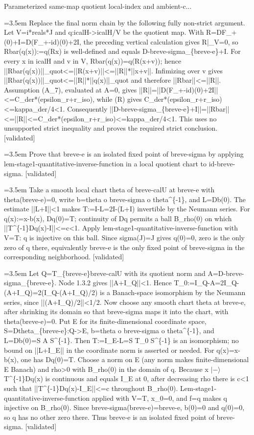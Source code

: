 \documentclass{article}
\newcommand{\step}[1]{\par\noindent\hangindent=3.5em\hangafter=1%
  \makebox[3.5em][l]{\textbf{#1.}}}
\newcommand{\steptag}[1]{\hfill{\small\textsf{[#1]}}}
\begin{document}
\begin{proofbox}{Parameterized same-map quotient local-index and ambient-c...}
\step{1.3.2.2} Replace the final norm chain by the following fully non-strict argument. Let V=i*reals*J and q:icalH->icalH/V be the quotient map. With R=DF\_+(0)+I=D(F\_+-id)(0)+2I, the preceding vertical calculation gives R|\_V=0, so Rbar(q(x)):=q(Rx) is well-defined and equals D-breve-sigma\_\{breve-e\}+I. For every x in icalH and v in V, Rbar(q(x))=q(R(x+v)); hence ||Rbar(q(x))||\_quot<=||R(x+v)||<=||R||*||x+v||. Infimizing over v gives ||Rbar(q(x))||\_quot<=||R||*||q(x)||\_quot and therefore ||Rbar||<=||R||. Assumption (A\_7), evaluated at A=0, gives ||R||=||D(F\_+-id)(0)+2I||<=C\_der*(epsilon\_r+r\_iso), while (R) gives C\_der*(epsilon\_r+r\_iso)<=kappa\_der/4<1. Consequently ||D-breve-sigma\_\{breve-e\}+I||=||Rbar||<=||R||<=C\_der*(epsilon\_r+r\_iso)<=kappa\_der/4<1. This uses no unsupported strict inequality and proves the required strict conclusion. \steptag{validated} \\[4pt]
\step{1.4} Prove that breve-e is an isolated fixed point of breve-sigma by applying lem-stage1-quantitative-inverse-function in a local quotient chart to id-breve-sigma. \steptag{validated} \\[6pt]
\step{1.4.1} Take a smooth local chart theta of breve-calU at breve-e with theta(breve-e)=0, write b=theta o breve-sigma o theta\textasciicircum{}\{-1\}, and L=Db(0). The estimate ||L+I||<1 makes T:=I-L=2I-(L+I) invertible by the Neumann series. For q(x):=x-b(x), Dq(0)=T; continuity of Dq permits a ball B\_rho(0) on which ||T\textasciicircum{}\{-1\}Dq(x)-I||<=c<1. Apply lem-stage1-quantitative-inverse-function with V=T: q is injective on this ball. Since sigma(J)=J gives q(0)=0, zero is the only zero of q there, equivalently breve-e is the only fixed point of breve-sigma in the corresponding neighborhood. \steptag{validated} \\[6pt]
\step{1.4.1.1} Let Q=T\_\{breve-e\}breve-calU with its quotient norm and A=D-breve-sigma\_\{breve-e\}. Node 1.3.2 gives ||A+I\_Q||<1. Hence T\_0:=I\_Q-A=2I\_Q-(A+I\_Q)=2(I\_Q-(A+I\_Q)/2) is a Banach-space isomorphism by the Neumann series, since ||(A+I\_Q)/2||<1/2. Now choose any smooth chart theta at breve-e, after shrinking its domain so that breve-sigma maps it into the chart, with theta(breve-e)=0. Put E for its finite-dimensional coordinate space, S=Dtheta\_\{breve-e\}:Q->E, b=theta o breve-sigma o theta\textasciicircum{}\{-1\}, and L=Db(0)=S A S\textasciicircum{}\{-1\}. Then T:=I\_E-L=S T\_0 S\textasciicircum{}\{-1\} is an isomorphism; no bound on ||L+I\_E|| in the coordinate norm is asserted or needed. For q(x)=x-b(x), one has Dq(0)=T. Choose a norm on E (any norm makes finite-dimensional E Banach) and rho>0 with B\_rho(0) in the domain of q. Because x $|-\rangle$ T\textasciicircum{}\{-1\}Dq(x) is continuous and equals I\_E at 0, after decreasing rho there is c<1 such that ||T\textasciicircum{}\{-1\}Dq(x)-I\_E||<=c throughout B\_rho(0). Lem-stage1-quantitative-inverse-function applied with V=T, x\_0=0, and f=q makes q injective on B\_rho(0). Since breve-sigma(breve-e)=breve-e, b(0)=0 and q(0)=0, so q has no other zero there. Thus breve-e is an isolated fixed point of breve-sigma. \steptag{validated} \\[4pt]

\end{proofbox}
\end{document}
